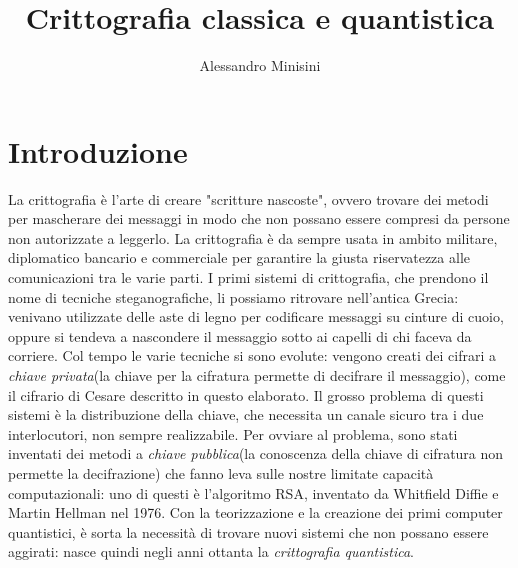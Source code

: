 \documentclass[italian,A4,12pt]{article}
\title{Crittografia classica e quantistica}
\author{Alessandro Minisini}
\affil{Liceo Scientifico Niccolò Copernico}
\date{}
\begin{document}
  \maketitle
  \newpage
  \tableofcontents
  \newpage
  \section{Introduzione}
  La crittografia è l'arte di creare "scritture nascoste", ovvero trovare dei metodi per mascherare dei messaggi in modo che non possano essere compresi da persone non autorizzate a leggerlo. La crittografia è da sempre usata in ambito militare, diplomatico bancario e commerciale per garantire la giusta riservatezza alle comunicazioni tra le varie parti. I primi sistemi di crittografia, che prendono il nome di tecniche steganografiche, li possiamo ritrovare nell'antica Grecia: venivano utilizzate delle aste di legno per codificare messaggi su cinture di cuoio, oppure si tendeva a nascondere il messaggio sotto ai capelli di chi faceva da corriere.
  Col tempo le varie tecniche si sono evolute: vengono creati dei cifrari a \textit{chiave privata}(la chiave per la cifratura permette di decifrare il messaggio), come il cifrario di Cesare descritto in questo elaborato.
  Il grosso problema di questi sistemi è la distribuzione della chiave, che necessita un canale sicuro tra i due interlocutori, non sempre realizzabile.
  Per ovviare al problema, sono stati inventati dei metodi a \textit{chiave pubblica}(la conoscenza della chiave di cifratura non permette la decifrazione) che fanno leva sulle nostre limitate capacità computazionali: uno di questi è l'algoritmo RSA, inventato da Whitfield Diffie e Martin Hellman nel 1976.
  Con la teorizzazione e la creazione dei primi computer quantistici, è sorta la necessità di trovare nuovi sistemi che non possano essere aggirati: nasce quindi negli anni ottanta la \textit{crittografia quantistica}.
\end{document}

